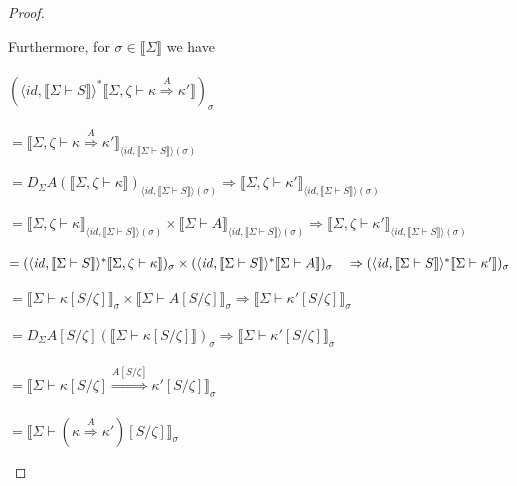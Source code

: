 \documentclass{article}
\newcommand{\sem}[1]{\llbracket #1 \rrbracket}
\begin{document}
\begin{proof}
\begin{description}
Furthermore, for $\sigma \in \sem{\Sigma}$ we have\\~\\ 
$(\langle \mathit{id}, \sem{\Sigma \vdash S} \rangle^* \sem{\Sigma,\zeta \vdash \kappa \overset{A}{\Rightarrow} \kappa'})_\sigma$\\~\\
$= \sem{\Sigma,\zeta \vdash \kappa \overset{A}{\Rightarrow} \kappa'}_{\langle \mathit{id}, \sem{\Sigma \vdash S} \rangle(\sigma)}$\\~\\
$= D_{\Sigma} A( \sem{\Sigma,\zeta \vdash \kappa} )_{\langle \mathit{id}, \sem{\Sigma \vdash S} \rangle(\sigma)} \Rightarrow \sem{\Sigma,\zeta \vdash \kappa'}_{\langle \mathit{id}, \sem{\Sigma \vdash S} \rangle(\sigma)}$\\~\\
$= \sem{\Sigma,\zeta \vdash \kappa}_{\langle \mathit{id}, \sem{\Sigma \vdash S} \rangle(\sigma)} \times \sem{\Sigma \vdash A}_{\langle \mathit{id}, \sem{\Sigma \vdash S} \rangle(\sigma)} \Rightarrow \sem{\Sigma,\zeta \vdash \kappa'}_{\langle \mathit{id}, \sem{\Sigma \vdash S} \rangle(\sigma)}$\\~\\
$= (\langle \mathit{id}, \sem{\Sigma \vdash S} \rangle^* \sem{\Sigma,\zeta \vdash \kappa} )_\sigma \times (\langle \mathit{id}, \sem{\Sigma \vdash S} \rangle^* \sem{\Sigma \vdash A})_\sigma \\ ~~~\Rightarrow (\langle \mathit{id}, \sem{\Sigma \vdash S} \rangle^* \sem{\Sigma \vdash \kappa'})_\sigma$\\~\\
$= \sem{\Sigma \vdash \kappa[S/\zeta]}_\sigma \times \sem{\Sigma \vdash A[S/\zeta]}_\sigma \Rightarrow \sem{\Sigma \vdash \kappa'[S/\zeta]}_\sigma$\\~\\
$= D_{\Sigma} A[S/\zeta] (\sem{\Sigma \vdash \kappa[S/\zeta]})_\sigma \Rightarrow \sem{\Sigma \vdash \kappa'[S/\zeta]}_\sigma$\\~\\
$= \sem{\Sigma \vdash \kappa[S/\zeta] \overset{A[S/\zeta]}{\Rightarrow} \kappa'[S/\zeta]}_\sigma $\\~\\
$= \sem{\Sigma \vdash (\kappa \overset{A}{\Rightarrow} \kappa')[S/\zeta] }_\sigma$


\end{description}
\end{proof}
\end{document}
